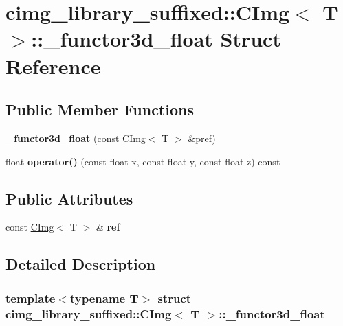 \hypertarget{structcimg__library__suffixed_1_1CImg_1_1__functor3d__float}{}\section{cimg\+\_\+library\+\_\+suffixed\+:\+:C\+Img$<$ T $>$\+:\+:\+\_\+functor3d\+\_\+float Struct Reference}
\label{structcimg__library__suffixed_1_1CImg_1_1__functor3d__float}
\subsection*{Public Member Functions}
\begin{DoxyCompactItemize}
\item 
\mbox{\label{structcimg__library__suffixed_1_1CImg_1_1__functor3d__float_ae04ad42104133ff47ef65a564e49e73c}} 
{\bfseries \+\_\+functor3d\+\_\+float} (const \hyperlink{structcimg__library__suffixed_1_1CImg}{C\+Img}$<$ T $>$ \&pref)
\item 
\mbox{\label{structcimg__library__suffixed_1_1CImg_1_1__functor3d__float_a46ac056612fddb7feeeecca759b7988f}} 
float {\bfseries operator()} (const float x, const float y, const float z) const
\end{DoxyCompactItemize}
\subsection*{Public Attributes}
\begin{DoxyCompactItemize}
\item 
\mbox{\label{structcimg__library__suffixed_1_1CImg_1_1__functor3d__float_a531d8e028bb752be2629ff14f9fc6a37}} 
const \hyperlink{structcimg__library__suffixed_1_1CImg}{C\+Img}$<$ T $>$ \& {\bfseries ref}
\end{DoxyCompactItemize}


\subsection{Detailed Description}
\subsubsection*{template$<$typename T$>$\newline
struct cimg\+\_\+library\+\_\+suffixed\+::\+C\+Img$<$ T $>$\+::\+\_\+functor3d\+\_\+float}



